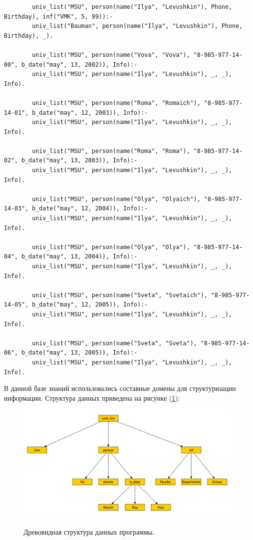 \documentclass[a4paper,12pt]{article}
\begin{document}
\begin{lstlisting}[label = lst0, caption = Листинг кода программы]
	    
	    
	    
	    
	    
	    univ_list("MSU", person(name("Ilya", "Levushkin"), Phone, Birthday), inf("VMK", 5, 99)):-
	    univ_list("Bauman", person(name("Ilya", "Levushkin"), Phone, Birthday), _).
	    
	    univ_list("MSU", person(name("Vova", "Vova"), "8-985-977-14-00", b_date("may", 13, 2002)), Info):-
	    univ_list("MSU", person(name("Ilya", "Levushkin"), _, _), Info).
	    
	    univ_list("MSU", person(name("Roma", "Romaich"), "8-985-977-14-01", b_date("may", 12, 2003)), Info):-
	    univ_list("MSU", person(name("Ilya", "Levushkin"), _, _), Info).
	    
	    univ_list("MSU", person(name("Roma", "Roma"), "8-985-977-14-02", b_date("may", 13, 2003)), Info):-
	    univ_list("MSU", person(name("Ilya", "Levushkin"), _, _), Info).
	    
	    univ_list("MSU", person(name("Olya", "Olyaich"), "8-985-977-14-03", b_date("may", 12, 2004)), Info):-
	    univ_list("MSU", person(name("Ilya", "Levushkin"), _, _), Info).
	    
	    univ_list("MSU", person(name("Olya", "Olya"), "8-985-977-14-04", b_date("may", 13, 2004)), Info):-
	    univ_list("MSU", person(name("Ilya", "Levushkin"), _, _), Info).
	    
	    univ_list("MSU", person(name("Sveta", "Svetaich"), "8-985-977-14-05", b_date("may", 12, 2005)), Info):-
	    univ_list("MSU", person(name("Ilya", "Levushkin"), _, _), Info).
	    
	    univ_list("MSU", person(name("Sveta", "Sveta"), "8-985-977-14-06", b_date("may", 13, 2005)), Info):-
	    univ_list("MSU", person(name("Ilya", "Levushkin"), _, _), Info).
	\end{lstlisting}
	
	В данной базе знаний использовались составные домены для структуризации информации.
	Структура данных приведена на рисунке (\ref{ris:1}):
	
		\begin{figure}[h!]
		\begin{center}
			{\includegraphics[scale = 0.6]{theme.png}}
		\end{center}
		\caption{Древовидная структура данных программы.}
		\label{ris:1}
	\end{figure}
	
\end{document}
